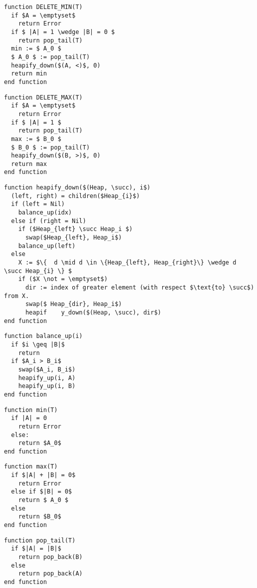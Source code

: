 \documentclass[12pt,a4paper]{article}
\theoremstyle{plain}
\begin{document}
\begin{lstlisting}[mathescape]
function DELETE_MIN(T) 
  if $A = \emptyset$
    return Error
  if $ |A| = 1 \wedge |B| = 0 $
    return pop_tail(T)
  min := $ A_0 $
  $ A_0 $ := pop_tail(T) 
  heapify_down($(A, <)$, 0)
  return min
end function
\end{lstlisting}

\begin{lstlisting}[mathescape]
function DELETE_MAX(T) 
  if $A = \emptyset$
    return Error
  if $ |A| = 1 $
    return pop_tail(T)
  max := $ B_0 $
  $ B_0 $ := pop_tail(T) 
  heapify_down($(B, >)$, 0)
  return max
end function
\end{lstlisting}

\begin{lstlisting}[mathescape]
function heapify_down($(Heap, \succ), i$)
  (left, right) = children($Heap_{i}$)
  if (left = Nil)
    balance_up(idx)
  else if (right = Nil)
    if ($Heap_{left} \succ Heap_i $)
      swap($Heap_{left}, Heap_i$)
    balance_up(left)
  else 
    X := $\{  d \mid d \in \{Heap_{left}, Heap_{right}\} \wedge d \succ Heap_{i} \} $
    if ($X \not = \emptyset$) 
      dir := index of greater element (with respect $\text{to} \succ$) from X.
      swap($ Heap_{dir}, Heap_i$)
      heapif	y_down($(Heap, \succ), dir$)
end function
\end{lstlisting}

\begin{lstlisting}[mathescape]
function balance_up(i)
  if $i \geq |B|$
    return
  if $A_i > B_i$
    swap($A_i, B_i$)
    heapify_up(i, A)
    heapify_up(i, B)
end function
\end{lstlisting}

\begin{lstlisting}[mathescape]
function min(T)
  if |A| = 0
    return Error
  else:
    return $A_0$
end function
\end{lstlisting}

\begin{lstlisting}[mathescape]
function max(T)
  if $|A| + |B| = 0$
    return Error
  else if $|B| = 0$
    return $ A_0 $
  else 
    return $B_0$
end function
\end{lstlisting}

\begin{lstlisting}[mathescape]
function pop_tail(T)
  if $|A| = |B|$
    return pop_back(B)
  else 
    return pop_back(A)
end function
\end{lstlisting}
\end{document}
